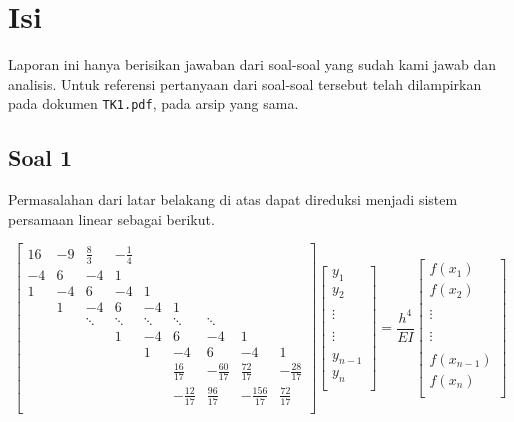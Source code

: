 \documentclass[12pt, a4paper, onecolumn, oneside, final]{report}
\begin{document}
\section*{Isi}

Laporan ini hanya berisikan jawaban dari soal-soal yang sudah kami jawab dan analisis. Untuk referensi pertanyaan dari soal-soal tersebut telah dilampirkan pada dokumen \texttt{TK1.pdf}, pada arsip yang sama.

\subsection*{Soal 1}

Permasalahan dari latar belakang di atas dapat direduksi menjadi sistem persamaan linear sebagai berikut.

\begin{equation*}
	\begin{bmatrix}
		16 & -9 & \frac{8}{3} & -\frac{1}{4} \\
		-4 & 6 & -4 & 1 \\
		1 & -4 & 6 & -4 & 1 \\
		  & 1 & -4 & 6 & -4 & 1 \\
		  & & \ddots & \ddots & \ddots & \ddots & \ddots \\
		  & & & 1 & -4 & 6 & -4 & 1 \\
		  & & & & 1 & -4 & 6 & -4 & 1 \\
		  & & & & & \frac{16}{17} & -\frac{60}{17} & \frac{72}{17} & -\frac{28}{17} \\
		  & & & & & -\frac{12}{17} & \frac{96}{17} & -\frac{156}{17} & \frac{72}{17} \\ 
	\end{bmatrix}
	\begin{bmatrix}
	    y_1\\
	    y_2\\
	    \\
	    \vdots\\
	    \\
	    \vdots\\
	    \\
	    y_{n-1}\\
	    y_n\\
	\end{bmatrix}
	=
	\frac{h^4}{EI}
	\begin{bmatrix}
	    f(x_1)\\
	    f(x_2)\\
	    \\
	    \vdots\\
	    \\
	    \vdots\\
	    \\
	    f(x_{n-1})\\
	    f(x_n)\\
	\end{bmatrix}
\end{equation*}
\end{document}
